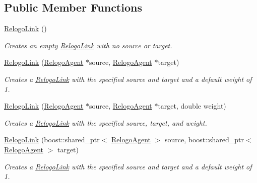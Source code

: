 \subsection*{Public Member Functions}
\begin{DoxyCompactItemize}
\item 
\hypertarget{classrepast_1_1relogo_1_1_relogo_link_aedbf01c7c5326863e179ceb2db1499bb}{\hyperlink{classrepast_1_1relogo_1_1_relogo_link_aedbf01c7c5326863e179ceb2db1499bb}{Relogo\-Link} ()}\label{classrepast_1_1relogo_1_1_relogo_link_aedbf01c7c5326863e179ceb2db1499bb}

\begin{DoxyCompactList}\small\item\em Creates an empty \hyperlink{classrepast_1_1relogo_1_1_relogo_link}{Relogo\-Link} with no source or target. \end{DoxyCompactList}\item 
\hyperlink{classrepast_1_1relogo_1_1_relogo_link_a56deff1fcae35290d55809fd92e7c99b}{Relogo\-Link} (\hyperlink{classrepast_1_1relogo_1_1_relogo_agent}{Relogo\-Agent} $\ast$source, \hyperlink{classrepast_1_1relogo_1_1_relogo_agent}{Relogo\-Agent} $\ast$target)
\begin{DoxyCompactList}\small\item\em Creates a \hyperlink{classrepast_1_1relogo_1_1_relogo_link}{Relogo\-Link} with the specified source and target and a default weight of 1. \end{DoxyCompactList}\item 
\hyperlink{classrepast_1_1relogo_1_1_relogo_link_a289496f5636c265ce5c8d8266029b8de}{Relogo\-Link} (\hyperlink{classrepast_1_1relogo_1_1_relogo_agent}{Relogo\-Agent} $\ast$source, \hyperlink{classrepast_1_1relogo_1_1_relogo_agent}{Relogo\-Agent} $\ast$target, double weight)
\begin{DoxyCompactList}\small\item\em Creates a \hyperlink{classrepast_1_1relogo_1_1_relogo_link}{Relogo\-Link} with the specified source, target, and weight. \end{DoxyCompactList}\item 
\hyperlink{classrepast_1_1relogo_1_1_relogo_link_aea1eb348b1a624d866a73f994c412f5e}{Relogo\-Link} (boost\-::shared\-\_\-ptr$<$ \hyperlink{classrepast_1_1relogo_1_1_relogo_agent}{Relogo\-Agent} $>$ source, boost\-::shared\-\_\-ptr$<$ \hyperlink{classrepast_1_1relogo_1_1_relogo_agent}{Relogo\-Agent} $>$ target)
\begin{DoxyCompactList}\small\item\em Creates a \hyperlink{classrepast_1_1relogo_1_1_relogo_link}{Relogo\-Link} with the specified source and target and a default weight of 1. \end{DoxyCompactList}\item 

\end{DoxyCompactItemize}
